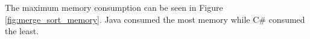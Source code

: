The maximum memory consumption can be seen in Figure \ref{fig:merge_sort_memory}. Java consumed the most memory while C\# consumed the least.

























